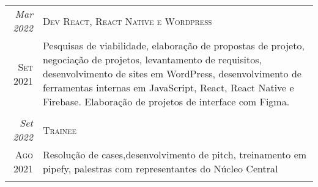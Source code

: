 \begin{framed}
\begin{tabular}{r|p{5cm}}
          \emph{Mar 2022}   & \textsc{Dev React, React Native e Wordpress }                                                                                                                                                                                                                                                                 \\
          \textsc{Set 2021} & \footnotesize{Pesquisas de viabilidade, elaboração de propostas de projeto, negociação de projetos, levantamento de requisitos, desenvolvimento de sites em WordPress, desenvolvimento de ferramentas internas em JavaScript, React, React Native e Firebase. Elaboração de projetos de interface com Figma.} \\
          \multicolumn{2}{c}{}                                                                                                                                                                                                                                                                                                              \\
    
          \emph{Set 2022}   & \textsc{Trainee}                                                                                                                                                                                                                                                                                              \\
          \textsc{Ago 2021} & \footnotesize{Resolução de cases,desenvolvimento de pitch, treinamento em pipefy, palestras com representantes do Núcleo Central}                                                                                                                                                                             \\
          \multicolumn{2}{c}{}                                                                                                                                                                                                                                                                                                              \\
        \end{tabular}
      \end{framed}
